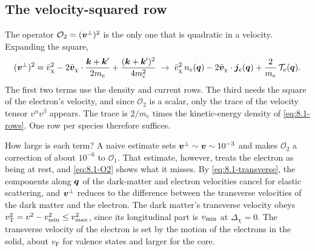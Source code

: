 \subsection{The velocity-squared row}\label{sec:8.1-v2}

The operator $\mathcal{O}_2 = (\bm{v}^\perp)^2$ is the only one that is quadratic in a velocity. Expanding the square,
\begin{equation}
  (\bm{v}^\perp)^2 = \bar v_\chi^2 - 2\bar{\bm{v}}_\chi\cdot\frac{\bm{k} + \bm{k}'}{2m_e} + \frac{(\bm{k} + \bm{k}')^2}{4m_e^2}
  \;\to\; \bar v_\chi^2\,n_e(\bm{q}) - 2\bar{\bm{v}}_\chi\cdot\bm{j}_e(\bm{q}) + \frac{2}{m_e}\,\mathcal{T}_e(\bm{q}) .
  \label{eq:8.1-O2}
\end{equation}
The first two terms use the density and current rows. The third needs the square of the electron's velocity, and since $\mathcal{O}_2$ is a scalar, only the trace of the velocity tensor $v^\alpha v^\beta$ appears. The trace is $2/m_e$ times the kinetic-energy density of \cref{eq:8.1-rows}. One row per species therefore suffices.

How large is each term? A naive estimate sets $\bm{v}^\perp \sim \bm{v} \sim 10^{-3}$ and makes $\mathcal{O}_2$ a correction of about $10^{-6}$ to $\mathcal{O}_1$. That estimate, however, treats the electron as being at rest, and \cref{eq:8.1-O2} shows what it misses. By \cref{eq:8.1-transverse}, the components along $\bm{q}$ of the dark-matter and electron velocities cancel for elastic scattering, and $\bm{v}^\perp$ reduces to the difference between the transverse velocities of the dark matter and the electron. The dark matter's transverse velocity obeys $v_{\mathrm{T}}^2 = v^2 - v_{\mathrm{min}}^2 \le v_{\mathrm{max}}^2$, since its longitudinal part is $v_{\mathrm{min}}$ at $\Delta_\chi = 0$. The transverse velocity of the electron is set by the motion of the electrons in the solid, about $v_{\mathrm{F}}$ for valence states and larger for the core.


